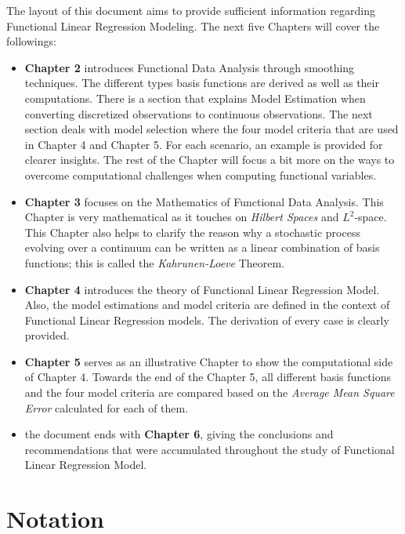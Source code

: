 The layout of this document aims to provide sufficient information regarding Functional Linear Regression Modeling. The next five Chapters will cover the followings:
\begin{itemize}
\item \textbf{Chapter 2} introduces Functional Data Analysis through smoothing techniques. The different types basis functions are derived as well as their computations. There is a section that explains Model Estimation when converting discretized observations to continuous observations. The next section deals with model selection where the four model criteria that are used in Chapter 4 and Chapter 5. For each scenario, an example is provided for clearer insights. The rest of the Chapter will focus a bit more on the ways to overcome computational challenges when computing functional variables.
\item \textbf{Chapter 3} focuses on the Mathematics of Functional Data Analysis. This Chapter is very mathematical as it touches on \textit{Hilbert Spaces} and $L^2$-space. This Chapter also helps to clarify the reason why a stochastic process evolving over a continuum can be written as a linear combination of basis functions; this is called the \textit{Kahrunen-Loeve} Theorem.
\item \textbf{Chapter 4} introduces the theory of Functional Linear Regression Model. Also, the model estimations and model criteria are defined in the context of Functional Linear Regression models. The derivation of every case is clearly provided.
\item \textbf{Chapter 5} serves as an illustrative Chapter to show the computational side of Chapter 4. Towards the end of the Chapter 5, all different basis functions and the four model criteria are compared based on the \textit{Average Mean Square Error} calculated for each of them.
\item the document ends with \textbf{Chapter 6}, giving the conclusions and recommendations that were accumulated throughout the study of Functional Linear Regression Model. 
\end{itemize}

\section{Notation}

